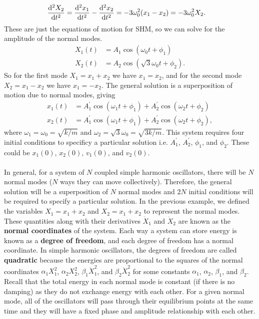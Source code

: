 \documentclass[../classical_mechanics.tex]{subfiles}
\begin{document}
\begin{example}
\begin{align}
                &\dv[2]{X_2}{t}=\dv[2]{x_1}{t}-\dv[2]{x_2}{t}=-3\omega_0^2(x_1-x_2)=-3\omega_0^2X_2.
            \end{align}
            These are just the equations of motion for SHM, so we can solve for the amplitude of the normal modes.
            \begin{align}
                X_1(t)&=A_1\cos(\omega_0t+\phi_1)\\
                X_2(t)&=A_2\cos(\sqrt{3}\omega_0t+\phi_2).
            \end{align}
            So for the first mode $X_1=x_1+x_2$ we have $x_1=x_2$, and for the second mode $X_2=x_1-x_2$ we have $x_1=-x_2$.
            The general solution is a superposition of motion due to normal modes, giving
            \begin{align}
                x_1(t)&=A_1^\prime\cos(\omega_1 t+\phi_1)+A_2^\prime\cos(\omega_2 t+\phi_2)\\
                x_2(t)&=A_1^\prime\cos(\omega_1 t+\phi_1)+A_2^\prime\cos(\omega_2 t+\phi_2),
            \end{align}
            where $\omega_1=\omega_0=\sqrt{k/m}$ and $\omega_2=\sqrt{3}\omega_0=\sqrt{3k/m}$.
            This system requires four initial conditions to specificy a particular solution i.e. $A_1^\prime$, $A_2^\prime$, $\phi_1$, and $\phi_2$.
            These could be $x_1(0)$, $x_2(0)$, $v_1(0)$, and $v_2(0)$.
        \end{example}

        \paragraph{}
        In general, for a system of $N$ coupled simple harmonic oscillators, there will be $N$ normal modes ($N$ ways they can move collectively).
        Therefore, the general solution will be a superposition of $N$ normal modes and $2N$ initial conditions will be required to specify a particular solution.
        In the previous example, we defined the variables $X_1=x_1+x_2$ and $X_2=x_1+x_2$ to represent the normal modes.
        These quantities along with their derivatives $\dot{X}_1$ and $\dot{X}_2$ are known as the \textbf{normal coordinates} of the system.
        Each way a system can store energy is known as a \textbf{degree of freedom}, and each degree of freedom has a normal coordinate.
        In simple harmonic oscillators, the degrees of freedom are called \textbf{quadratic} because the energies are proportional to the squares of the normal coordinates $\alpha_1X_1^2$, $\alpha_2X_2^2$, $\beta_1\dot{X}_1^2$, and $\beta_2\dot{X}_2^2$ for some constants $\alpha_1$, $\alpha_2$, $\beta_1$, and $\beta_2$.
        Recall that the total energy in each normal mode is constant (if there is no damping) as they do not exchange energy with each other.
        For a given normal mode, all of the oscillators will pass through their equilibrium points at the same time and they will have a fixed phase and amplitude relationship with each other.

\end{document}
